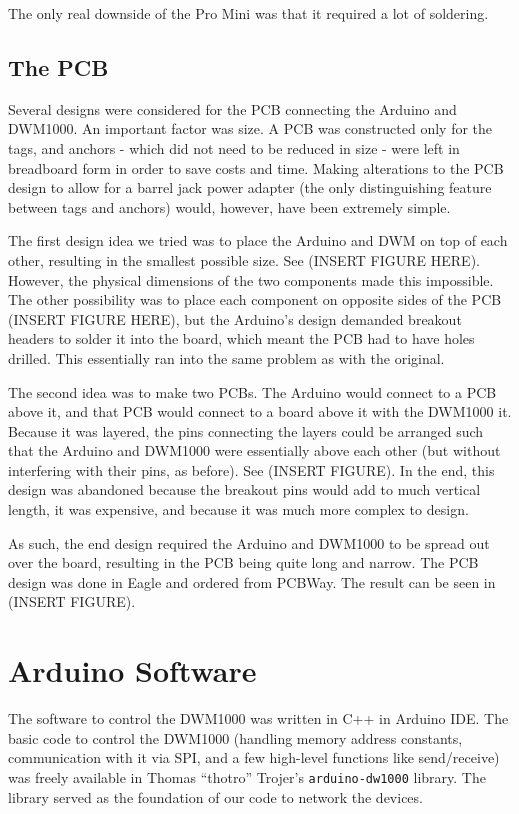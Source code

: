 The only real downside of the Pro Mini was that it required a lot of soldering. 

\subsection{The PCB}
Several designs were considered for the PCB connecting the Arduino and DWM1000. An important factor was size. A PCB was constructed only for the tags, and anchors - which did not need to be reduced in size - were left in breadboard form in order to save costs and time. Making alterations to the PCB design to allow for a barrel jack power adapter (the only distinguishing feature between tags and anchors) would, however, have been extremely simple.

The first design idea we tried was to place the Arduino and DWM on top of each other, resulting in the smallest possible size. See (INSERT FIGURE HERE). However, the physical dimensions of the two components made this impossible. The other possibility was to place each component on opposite sides of the PCB (INSERT FIGURE HERE), but the Arduino's design demanded breakout headers to solder it into the board, which meant the PCB had to have holes drilled. This essentially ran into the same problem as with the original.

The second idea was to make two PCBs. The Arduino would connect to a PCB above it, and that PCB would connect to a board above it with the DWM1000 it. Because it was layered, the pins connecting the layers could be arranged such that the Arduino and DWM1000 were essentially above each other (but without interfering with their pins, as before). See (INSERT FIGURE). In the end, this design was abandoned because the breakout pins would add to much vertical length, it was expensive, and because it was much more complex to design.

As such, the end design required the Arduino and DWM1000 to be spread out over the board, resulting in the PCB being quite long and narrow. The PCB design was done in Eagle and ordered from PCBWay. The result can be seen in (INSERT FIGURE).

\section{Arduino Software}
The software to control the DWM1000 was written in C++ in Arduino IDE. The basic code to control the DWM1000 (handling memory address constants, communication with it via SPI, and a few high-level functions like send/receive) was freely available in Thomas ``thotro'' Trojer's \texttt{arduino-dw1000} library. The library served as the foundation of our code to network the devices.

